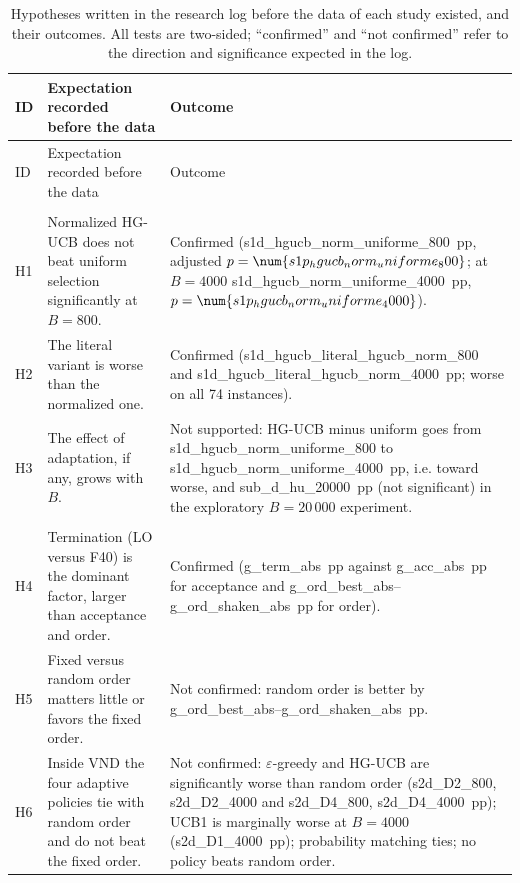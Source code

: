 \begin{center}
\small
\begin{longtable}{>{\raggedright\arraybackslash}p{0.9cm}>{\raggedright\arraybackslash}p{5.2cm}>{\raggedright\arraybackslash}p{8.5cm}}
\caption{Hypotheses written in the research log before the data of each study existed, and their outcomes. All tests are two-sided; ``confirmed'' and ``not confirmed'' refer to the direction and significance expected in the log.}\label{tab:hip}\\
\toprule
ID & Expectation recorded before the data & Outcome \\
\midrule
\endfirsthead
\toprule
ID & Expectation recorded before the data & Outcome \\
\midrule
\endhead
\bottomrule
\endfoot
\multicolumn{3}{l}{\emph{Study 1 (log entry 64)}} \\
H1 & Normalized HG-UCB does not beat uniform selection significantly at $B=800$. & Confirmed (\num{s1d_hgucb_norm_uniforme_800}~pp, adjusted $p=\num{s1p_hgucb_norm_uniforme_800}$; at $B=4000$ \num{s1d_hgucb_norm_uniforme_4000}~pp, $p=\num{s1p_hgucb_norm_uniforme_4000}$). \\
H2 & The literal variant is worse than the normalized one. & Confirmed (\num{s1d_hgucb_literal_hgucb_norm_800} and \num{s1d_hgucb_literal_hgucb_norm_4000}~pp; worse on all 74 instances). \\
H3 & The effect of adaptation, if any, grows with $B$. & Not supported: HG-UCB minus uniform goes from \num{s1d_hgucb_norm_uniforme_800} to \num{s1d_hgucb_norm_uniforme_4000}~pp, i.e. toward worse, and \num{sub_d_hu_20000}~pp (not significant) in the exploratory $B=20\,000$ experiment. \\
\midrule
\multicolumn{3}{l}{\emph{Study 2 (log entry 71)}} \\
H4 & Termination (LO versus F40) is the dominant factor, larger than acceptance and order. & Confirmed (\num{g_term_abs}~pp against \num{g_acc_abs}~pp for acceptance and \num{g_ord_best_abs}--\num{g_ord_shaken_abs}~pp for order). \\
H5 & Fixed versus random order matters little or favors the fixed order. & Not confirmed: random order is better by \num{g_ord_best_abs}--\num{g_ord_shaken_abs}~pp. \\
H6 & Inside VND the four adaptive policies tie with random order and do not beat the fixed order. & Not confirmed: $\varepsilon$-greedy and HG-UCB are significantly worse than random order (\num{s2d_D2_800}, \num{s2d_D2_4000} and \num{s2d_D4_800}, \num{s2d_D4_4000}~pp); UCB1 is marginally worse at $B=4000$ (\num{s2d_D1_4000}~pp); probability matching ties; no policy beats random order. \\

\end{longtable}
\end{center}
